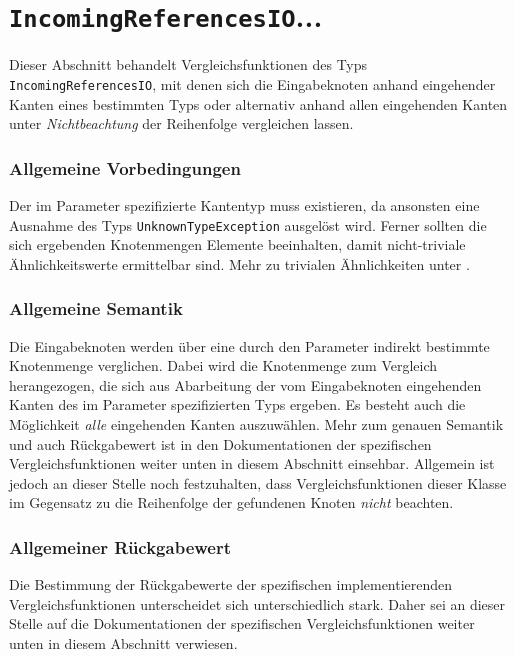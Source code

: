 %
%

\section{\texttt{IncomingReferencesIO}...}
\label{strct:spec:inrefsio}
Dieser Abschnitt behandelt Vergleichsfunktionen des Typs \texttt{IncomingReferencesIO}, mit denen sich die Eingabeknoten anhand eingehender Kanten eines bestimmten Typs oder alternativ anhand allen eingehenden Kanten unter \emph{Nichtbeachtung} der Reihenfolge vergleichen lassen.

\subsubsection*{Allgemeine Vorbedingungen}
Der im Parameter spezifizierte Kantentyp muss existieren, da ansonsten eine Ausnahme des Typs \texttt{UnknownTypeException} ausgelöst wird. Ferner sollten die sich ergebenden Knotenmengen Elemente beeinhalten, damit nicht-triviale Ähnlichkeitswerte ermittelbar sind. Mehr zu trivialen Ähnlichkeiten unter .

\subsubsection*{Allgemeine Semantik}
Die Eingabeknoten werden über eine durch den Parameter indirekt bestimmte Knotenmenge verglichen. Dabei wird die Knotenmenge zum Vergleich herangezogen, die sich aus Abarbeitung der vom Eingabeknoten eingehenden Kanten des im Parameter spezifizierten Typs ergeben. Es besteht auch die Möglichkeit \emph{alle} eingehenden Kanten auszuwählen. Mehr zum genauen Semantik und auch Rückgabewert ist in den Dokumentationen der spezifischen Vergleichsfunktionen weiter unten in diesem Abschnitt einsehbar. Allgemein ist jedoch an dieser Stelle noch festzuhalten, dass Vergleichsfunktionen dieser Klasse im Gegensatz zu  die Reihenfolge der gefundenen Knoten \emph{nicht} beachten.

\subsubsection*{Allgemeiner Rückgabewert}
Die Bestimmung der Rückgabewerte der spezifischen implementierenden Vergleichsfunktionen unterscheidet sich unterschiedlich stark. Daher sei an dieser Stelle auf die Dokumentationen der spezifischen Vergleichsfunktionen weiter unten in diesem Abschnitt verwiesen.

